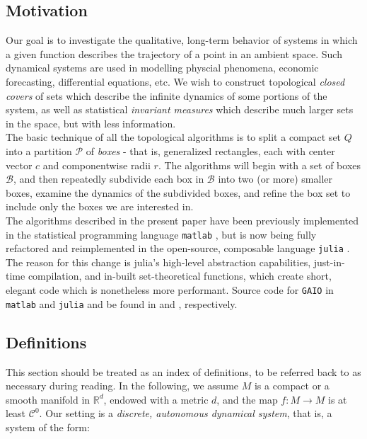 
\subsection{Motivation}\label{sec:mot}

Our goal is to investigate the qualitative, long-term behavior of systems in which a given 
function describes the trajectory of a point in an ambient space. Such dynamical systems 
are used in modelling physcial phenomena, economic forecasting, differential equations, etc. 
We wish to construct topological \emph{closed covers} of sets which describe the infinite 
dynamics of some portions of the system, as well as statistical \emph{invariant measures} 
which describe much larger sets in the space, but with less information. \\

The basic technique of all the topological algorithms is to split a compact set $Q$ into 
a partition $\mathcal{P}$ of \emph{boxes} - that is, generalized rectangles, each with 
center vector $c$ and componentwise radii $r$. The algorithms will begin with a set of boxes 
$\mathcal{B}$, and then repeatedly subdivide each box in $\mathcal{B}$ into two (or more) 
smaller boxes, examine the dynamics of the subdivided boxes, and refine the box set to 
include only the boxes we are interested in. \\

The algorithms described in the present paper have been previously implemented in the 
statistical programming language \texttt{matlab} \cite*{matlab}, but is now being fully refactored and
reimplemented in the open-source, composable language \texttt{julia} \cite*{julia}. The reason for this 
change is julia's high-level abstraction capabilities, just-in-time compilation, and 
in-built set-theoretical functions, which create short, elegant code which is nonetheless 
more performant. Source code for \texttt{GAIO} in \texttt{matlab} and \texttt{julia} and be 
found in \cite*{oldGAIO} and \cite*{GAIO}, respectively.

\subsection{Definitions}

This section should be treated as an index of definitions, to be referred back to as 
necessary during reading. In the following, we assume $M$ is a compact or a smooth manifold 
in $\mathbb{R}^d$, endowed with a metric $d$, and the 
map $f: M \to M$ is at least $\mathcal{C}^0$. Our setting is a 
\emph{discrete, autonomous dynamical system}, that is, a system of the form:

